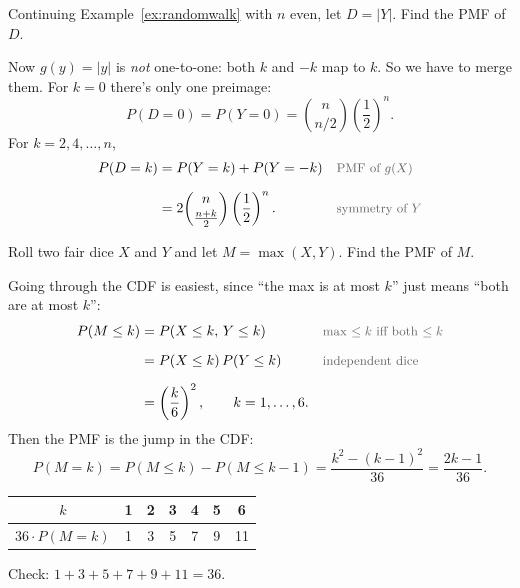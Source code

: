 \bigskip

\begin{example}
Continuing Example~\ref{ex:randomwalk} with $n$ even, let $D = |Y|$. Find the PMF of $D$.
\end{example}

\medskip

\begin{solution}
Now $g(y) = |y|$ is \emph{not} one-to-one: both $k$ and $-k$ map to $k$. So we have to merge them. For $k = 0$ there's only one preimage:
\medskip
\[
P(D = 0) = P(Y = 0) = \binom{n}{n/2} \left(\frac{1}{2}\right)^{n}.
\]
\medskip
For $k = 2, 4, \dots, n$,
\medskip
\begin{align*}
P(D = k)
  &= P(Y = k) + P(Y = -k)
  && \by{PMF of $g(X)$} \\[0.6em]
  &= 2\binom{n}{\frac{n + k}{2}} \left(\frac{1}{2}\right)^{n}.
  && \by{symmetry of $Y$}
\end{align*}
\end{solution}

\bigskip

\begin{example}\label{ex:maxdice}
Roll two fair dice $X$ and $Y$ and let $M = \max(X, Y)$. Find the PMF of $M$.
\end{example}

\medskip

\begin{solution}
Going through the CDF is easiest, since ``the max is at most $k$'' just means ``both are at most $k$'':
\medskip
\begin{align*}
P(M \le k)
  &= P(X \le k,\, Y \le k)
  && \by{max $\le k$ iff both $\le k$} \\[0.6em]
  &= P(X \le k)\,P(Y \le k)
  && \by{independent dice} \\[0.6em]
  &= \left(\frac{k}{6}\right)^{2}, \qquad k = 1, \dots, 6.
\end{align*}
\medskip
Then the PMF is the jump in the CDF:
\medskip
\[
P(M = k) = P(M \le k) - P(M \le k - 1) = \frac{k^{2} - (k - 1)^{2}}{36} = \frac{2k - 1}{36}.
\]
\medskip
\begin{center}
\begin{tabular}{@{}c*{6}{c}@{}}
\toprule
$k$ & 1 & 2 & 3 & 4 & 5 & 6 \\
\midrule
$36 \cdot P(M = k)$ & 1 & 3 & 5 & 7 & 9 & 11 \\
\bottomrule
\end{tabular}
\end{center}
\medskip
Check: $1 + 3 + 5 + 7 + 9 + 11 = 36$.
\end{solution}

